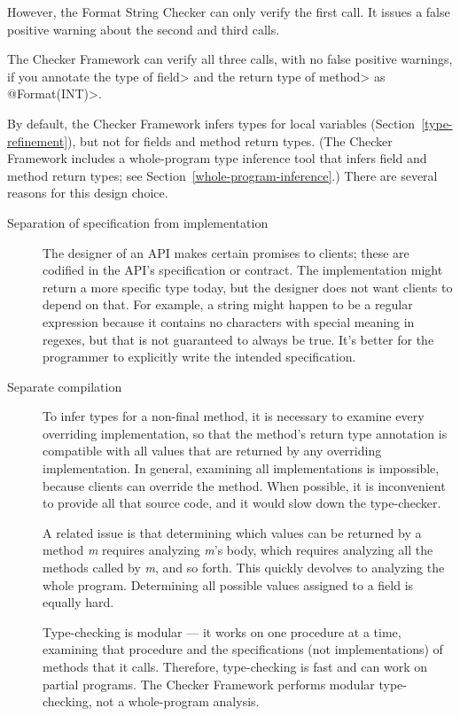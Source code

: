 \noindent
However, the Format String Checker can only verify the first call.  It issues a
false positive warning about the second and third calls.

The Checker Framework can verify all three calls, with no false positive
warnings, if you annotate the type of \<field> and the return type of
\<method> as \<@Format(INT)>.

By default, the Checker Framework infers types for local variables
(Section~\ref{type-refinement}), but not for fields and method return
types.  (The Checker Framework includes a whole-program type inference tool
that infers field and method return types; see
Section~\ref{whole-program-inference}.)
There are several reasons for this design choice.

\begin{description}
\item[Separation of specification from implementation]
  The designer of an API makes certain promises to clients; these are
  codified in the API's specification or contract.  The implementation
  might return a more specific type today, but the designer does not want
  clients to depend on that.  For example, a string might happen to be a
  regular expression because it contains no characters with special meaning
  in regexes, but that is not guaranteed to always be true.  It's better
  for the programmer to explicitly write the intended specification.

\item[Separate compilation]
  To infer types for a non-final method, it is necessary to examine every
  overriding implementation, so that the method's return type annotation is
  compatible with all values that are returned by any overriding
  implementation.  In general, examining all implementations is impossible,
  because clients can override the method.  When possible, it is
  inconvenient to provide all that source code, and it would slow down the
  type-checker.

  A related issue is that determining which values can be returned by a
  method \textit{m} requires analyzing \textit{m}'s body, which requires analyzing
  all the methods called by \textit{m}, and so forth.  This quickly devolves to
  analyzing the whole program.
  Determining all possible values assigned to a field is equally hard.

  Type-checking is modular --- it works on one procedure at a time,
  examining that procedure and the specifications (not implementations) of
  methods that it calls.  Therefore, type-checking is fast and can work on
  partial programs.  The Checker Framework performs modular type-checking,
  not a whole-program analysis.


\end{description}
